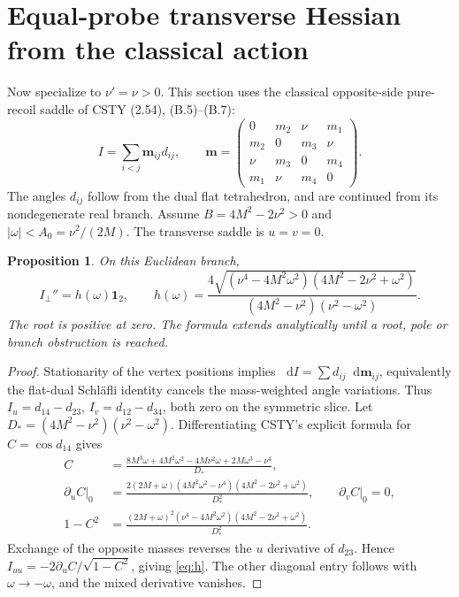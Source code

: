 \documentclass[11pt,a4paper]{article}
\newtheorem{proposition}{Proposition}
\newcommand{\dd}{\mathop{}\!\mathrm d}
\begin{document}
\section{Equal-probe transverse Hessian from the classical action}
Now specialize to \(\nu'=\nu>0\). This section uses the classical
opposite-side pure-recoil saddle of CSTY (2.54), (B.5)--(B.7):
\[
 I=\sum_{i<j}\mathbf m_{ij}d_{ij},\qquad
 \mathbf m=\begin{pmatrix}
 0&m_2&\nu&m_1\\m_2&0&m_3&\nu\\
 \nu&m_3&0&m_4\\m_1&\nu&m_4&0
 \end{pmatrix}.
\]
The angles \(d_{ij}\) follow from the dual flat tetrahedron, and are
continued from its nondegenerate real branch.
Assume \(B=4M^2-2\nu^2>0\) and \(|\omega|<A_0=\nu^2/(2M)\).
The transverse saddle is \(u=v=0\).

\begin{proposition}
On this Euclidean branch,
\begin{equation}
 I_{\perp}''=h(\omega)\mathbf1_2,\qquad
 h(\omega)=
 \frac{4\sqrt{(\nu^4-4M^2\omega^2)(4M^2-2\nu^2+\omega^2)}}
 {(4M^2-\nu^2)(\nu^2-\omega^2)}.
 \label{eq:h}
\end{equation}
The root is positive at zero. The formula extends analytically until
a root, pole or branch obstruction is reached.
\end{proposition}
\begin{proof}
Stationarity of the vertex positions implies
\(\dd I=\sum d_{ij}\dd\mathbf m_{ij}\), equivalently the flat-dual
Schl\"afli identity cancels the mass-weighted angle variations.
Thus \(I_u=d_{14}-d_{23}\), \(I_v=d_{12}-d_{34}\), both zero
on the symmetric slice. Let
\(D_*=(4M^2-\nu^2)(\nu^2-\omega^2)\).
Differentiating CSTY's explicit formula for \(C=\cos d_{14}\) gives
\begin{align}
 C&=\frac{8M^3\omega+4M^2\omega^2-4M\nu^2\omega
              +2M\omega^3-\nu^4}{D_*},\\
 \left.\partial_u C\right|_0
 &=\frac{2(2M+\omega)(4M^2\omega^2-\nu^4)
                   (4M^2-2\nu^2+\omega^2)}{D_*^2},
 \qquad \left.\partial_v C\right|_0=0,\\
 1-C^2&=\frac{(2M+\omega)^2(\nu^4-4M^2\omega^2)
                   (4M^2-2\nu^2+\omega^2)}{D_*^2}.
\end{align}
Exchange of the opposite masses reverses the \(u\) derivative of
\(d_{23}\). Hence \(I_{uu}=-2\partial_u C/\sqrt{1-C^2}\),
giving \eqref{eq:h}. The other diagonal entry follows with
\(\omega\to-\omega\), and the mixed derivative vanishes.
\end{proof}
\end{document}
